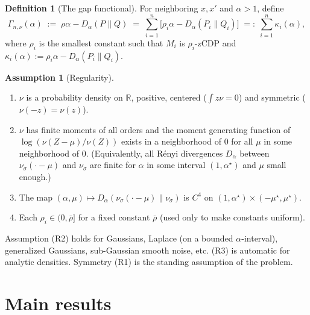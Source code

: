 \documentclass[11pt]{article}
\theoremstyle{definition}
\newtheorem{definition}[theorem]{Definition}
\newtheorem{assumption}[theorem]{Assumption}
\newcommand{\R}{\mathbb{R}}
\begin{document}
\begin{definition}[The gap functional]
For neighboring $x,x'$ and $\alpha>1$, define
\[
\Gamma_{n,\nu}(\alpha)\;:=\;\rho\alpha-D_\alpha(P\|Q)\;=\;\sum_{i=1}^n\bigl[\rho_i\alpha-D_\alpha(P_i\|Q_i)\bigr]\;=:\;\sum_{i=1}^n\kappa_i(\alpha),
\]
where $\rho_i$ is the smallest constant such that $M_i$ is $\rho_i$-zCDP and $\kappa_i(\alpha):=\rho_i\alpha-D_\alpha(P_i\|Q_i)$.
\end{definition}

\begin{assumption}[Regularity]\label{ass:reg}
\leavevmode
\begin{enumerate}[label=(R\arabic*),leftmargin=*]
\item $\nu$ is a probability density on $\R$, positive, centered ($\int z\nu=0$) and symmetric ($\nu(-z)=\nu(z)$).
\item $\nu$ has finite moments of all orders and the moment generating function of $\log(\nu(Z-\mu)/\nu(Z))$ exists in a neighborhood of $0$ for all $\mu$ in some neighborhood of $0$. (Equivalently, all R\'enyi divergences $D_\alpha$ between $\nu_\sigma(\cdot-\mu)$ and $\nu_\sigma$ are finite for $\alpha$ in some interval $(1,\alpha^\star)$ and $\mu$ small enough.)
\item The map $(\alpha,\mu)\mapsto D_\alpha(\nu_\sigma(\cdot-\mu)\|\nu_\sigma)$ is $C^4$ on $(1,\alpha^\star)\times(-\mu^\star,\mu^\star)$.
\item Each $\rho_i\in(0,\bar\rho]$ for a fixed constant $\bar\rho$ (used only to make constants uniform).
\end{enumerate}
\end{assumption}

Assumption (R2) holds for Gaussians, Laplace (on a bounded $\alpha$-interval), generalized Gaussians, sub-Gaussian smooth noise, etc. (R3) is automatic for analytic densities. Symmetry (R1) is the standing assumption of the problem.

\section{Main results}
\end{document}
